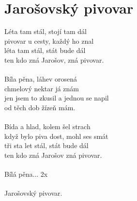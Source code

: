 \section{Jarošovský pivovar}
Léta tam stál, stojí tam dál\\
pivovar u cesty, každý ho znal\\
léta tam stál, stát bude dál\\
ten kdo zná Jarošov, zná pivovar.\\
\\
Bíla pěna, láhev orosená\\
chmelový nektar já znám\\
jen jsem to zkusil a jednou se napil\\
od těch dob žízeň mám.\\
\\
Bída a hlad, kolem šel strach\\
když bylo piva dost, mohl ses smát\\
tři sta let stál, stát bude dál\\
ten kdo zná Jarošov zná pivovar.\\
\\
Bílá pěna... 2x\\
\\
Jarošovský pivovar.\\
